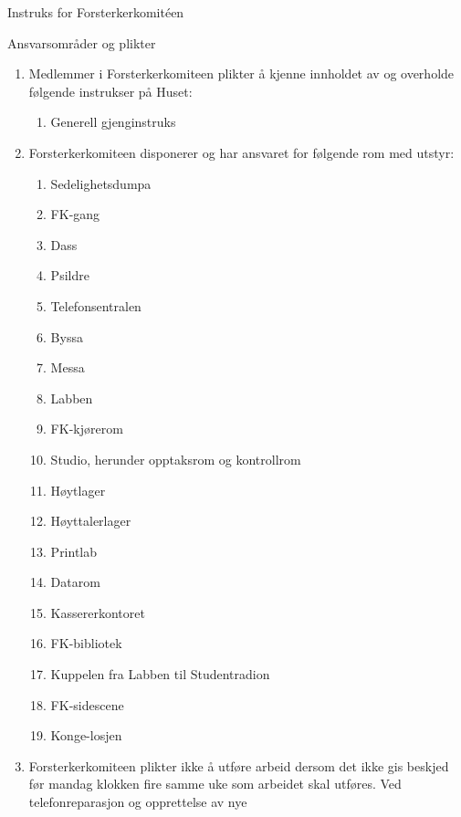 \begin{instruks*}{Instruks for Forsterkerkomit\'een}
    \begin{instruksledd}{Ansvarsområder og plikter}
        \begin{enumerate}
            \item Medlemmer i Forsterkerkomiteen plikter å kjenne innholdet av og overholde følgende
                instrukser på Huset:
                \begin{enumerate}
                    \item Generell gjenginstruks
                \end{enumerate}
            \item Forsterkerkomiteen disponerer og har ansvaret for følgende rom med utstyr:
                \begin{enumerate}
                    \item Sedelighetsdumpa
                     \item FK-gang
                    \item Dass
                    \item Psildre
                    \item Telefonsentralen
                    \item Byssa
                    \item Messa
                    \item Labben
                    \item FK-kjørerom
                    \item Studio, herunder opptaksrom og kontrollrom
                    \item Høytlager
                    \item Høyttalerlager
                    \item Printlab
                    \item Datarom
                    \item Kassererkontoret
                    \item FK-bibliotek
                    \item Kuppelen fra Labben til Studentradion
                    \item FK-sidescene
                    \item Konge-losjen
                \end{enumerate}
            \item Forsterkerkomiteen plikter ikke å utføre arbeid dersom det ikke gis beskjed
                før mandag klokken fire samme
                uke som arbeidet skal utføres. Ved telefonreparasjon og opprettelse av nye

\end{enumerate}
\end{instruksledd}
\end{instruks*}
